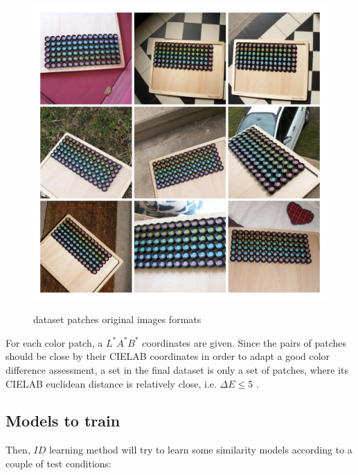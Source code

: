 \begin{figure}[H] \label{set_ds}
			\includegraphics[width=\linewidth,height=12cm,keepaspectratio]{Figures/set_ds}
			\caption[set ds]
			{dataset patches original images formats}
\end{figure}

For each color patch, a $L^*A^*B^*$ \cite{lab} coordinates are given. 
Since the pairs of patches should be close by their CIELAB \cite{CIELAB} coordinates in order to adapt a good color difference assessment, a set in the final dataset is only a set of patches, where its CIELAB euclidean distance is relatively close, i.e. $\Delta E \leq 5$ .




\subsection{Models to train}
\label{color_cam}
Then, $ID$ learning method will try to learn some similarity models according to a couple of test conditions:

